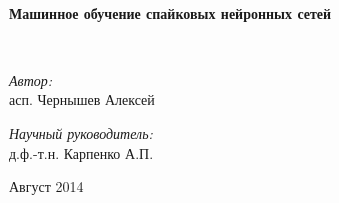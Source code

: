 \begin{titlepage}
\begin{center}
\HRule \\[0.4cm]
{ \huge \bfseries Машинное обучение спайковых нейронных сетей \\[0.4cm] }

\HRule \\[1.5cm]
\begin{minipage}{0.4\textwidth}
\begin{flushleft} \large
\emph{Автор:}\\
асп. Чернышев Алексей
\end{flushleft}
\end{minipage}
\begin{minipage}{0.4\textwidth}
\begin{flushright} \large
\emph{Научный руководитель:} \\
д.ф.-т.н. Карпенко А.П.
\end{flushright}
\end{minipage}

\vfill

{\large Август 2014}

\end{center}
\end{titlepage}
